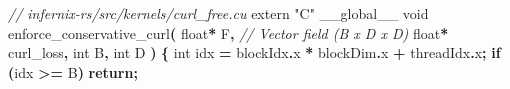 \documentclass[
  11pt,
  a4paper,
]{article}
\newenvironment{Shaded}{\begin{snugshade}}{\end{snugshade}}
\newcommand{\AttributeTok}[1]{\textcolor[rgb]{0.13,0.29,0.53}{#1}}
\newcommand{\CommentTok}[1]{\textcolor[rgb]{0.56,0.35,0.01}{\textit{#1}}}
\newcommand{\ControlFlowTok}[1]{\textcolor[rgb]{0.13,0.29,0.53}{\textbf{#1}}}
\newcommand{\DataTypeTok}[1]{\textcolor[rgb]{0.13,0.29,0.53}{#1}}
\newcommand{\NormalTok}[1]{#1}
\newcommand{\OperatorTok}[1]{\textcolor[rgb]{0.81,0.36,0.00}{\textbf{#1}}}
\newcommand{\StringTok}[1]{\textcolor[rgb]{0.31,0.60,0.02}{#1}}
\begin{document}
\begin{Shaded}
\begin{Highlighting}[]
\CommentTok{// infernix{-}rs/src/kernels/curl\_free.cu}
\AttributeTok{extern} \StringTok{"C"}\NormalTok{ \_\_global\_\_ }\DataTypeTok{void}
\NormalTok{enforce\_conservative\_curl}\OperatorTok{(}
    \DataTypeTok{float}\OperatorTok{*}\NormalTok{ F}\OperatorTok{,}        \CommentTok{// Vector field (B x D x D)}
    \DataTypeTok{float}\OperatorTok{*}\NormalTok{ curl\_loss}\OperatorTok{,}
    \DataTypeTok{int}\NormalTok{ B}\OperatorTok{,} \DataTypeTok{int}\NormalTok{ D}
\OperatorTok{)} \OperatorTok{\{}
    \DataTypeTok{int}\NormalTok{ idx }\OperatorTok{=}\NormalTok{ blockIdx}\OperatorTok{.}\NormalTok{x }\OperatorTok{*}\NormalTok{ blockDim}\OperatorTok{.}\NormalTok{x }\OperatorTok{+}\NormalTok{ threadIdx}\OperatorTok{.}\NormalTok{x}\OperatorTok{;}
    \ControlFlowTok{if} \OperatorTok{(}\NormalTok{idx }\OperatorTok{\textgreater{}=}\NormalTok{ B}\OperatorTok{)} \ControlFlowTok{return}\OperatorTok{;}
    

\end{Highlighting}
\end{Shaded}
\end{document}
